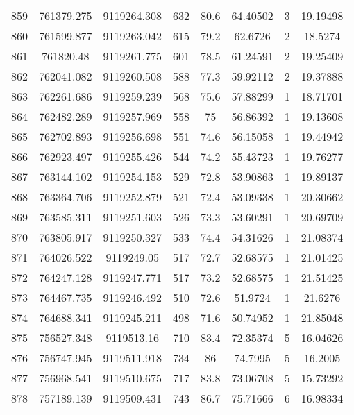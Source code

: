 \begin{longtable}{cccccccc}
859  & 761379.275      & 9119264.308      & 632     & 80.6  & 64.40502 & 3  & 19.19498 \\
860  & 761599.877      & 9119263.042      & 615     & 79.2  & 62.6726  & 2  & 18.5274  \\
861  & 761820.48       & 9119261.775      & 601     & 78.5  & 61.24591 & 2  & 19.25409 \\
862  & 762041.082      & 9119260.508      & 588     & 77.3  & 59.92112 & 2  & 19.37888 \\
863  & 762261.686      & 9119259.239      & 568     & 75.6  & 57.88299 & 1  & 18.71701 \\
864  & 762482.289      & 9119257.969      & 558     & 75    & 56.86392 & 1  & 19.13608 \\
865  & 762702.893      & 9119256.698      & 551     & 74.6  & 56.15058 & 1  & 19.44942 \\
866  & 762923.497      & 9119255.426      & 544     & 74.2  & 55.43723 & 1  & 19.76277 \\
867  & 763144.102      & 9119254.153      & 529     & 72.8  & 53.90863 & 1  & 19.89137 \\
868  & 763364.706      & 9119252.879      & 521     & 72.4  & 53.09338 & 1  & 20.30662 \\
869  & 763585.311      & 9119251.603      & 526     & 73.3  & 53.60291 & 1  & 20.69709 \\
870  & 763805.917      & 9119250.327      & 533     & 74.4  & 54.31626 & 1  & 21.08374 \\
871  & 764026.522      & 9119249.05       & 517     & 72.7  & 52.68575 & 1  & 21.01425 \\
872  & 764247.128      & 9119247.771      & 517     & 73.2  & 52.68575 & 1  & 21.51425 \\
873  & 764467.735      & 9119246.492      & 510     & 72.6  & 51.9724  & 1  & 21.6276  \\
874  & 764688.341      & 9119245.211      & 498     & 71.6  & 50.74952 & 1  & 21.85048 \\
875  & 756527.348      & 9119513.16       & 710     & 83.4  & 72.35374 & 5  & 16.04626 \\
876  & 756747.945      & 9119511.918      & 734     & 86    & 74.7995  & 5  & 16.2005  \\
877  & 756968.541      & 9119510.675      & 717     & 83.8  & 73.06708 & 5  & 15.73292 \\
878  & 757189.139      & 9119509.431      & 743     & 86.7  & 75.71666 & 6  & 16.98334 \\

\end{longtable}

